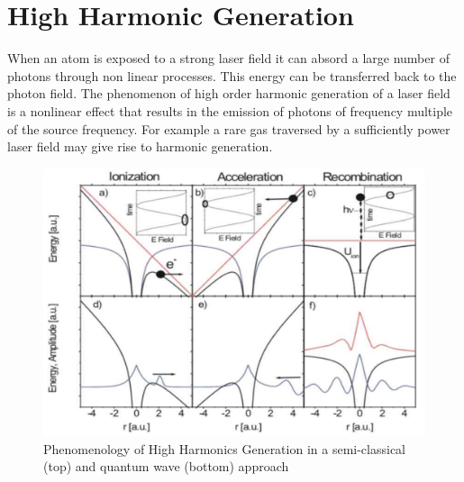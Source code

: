 \section{High Harmonic Generation}
When an atom is exposed to a strong laser field it can absord a large number of photons through non linear processes. This energy can be transferred back to the photon field.
The phenomenon of high order harmonic generation of a laser field is a nonlinear effect that results in the emission of photons of frequency multiple of the source frequency. For example a rare gas traversed by a sufficiently power laser field may give rise to harmonic generation.
\begin{figure}[htbp]
\begin{center}
\includegraphics[width=12cm]{../Pictures/Chapter_7/HHG}
\end{center}
\caption[HHG phenomenology]{Phenomenology of High Harmonics Generation in a semi-classical (top) and quantum wave (bottom) approach}
\label{fig:HHG}
\end{figure}

